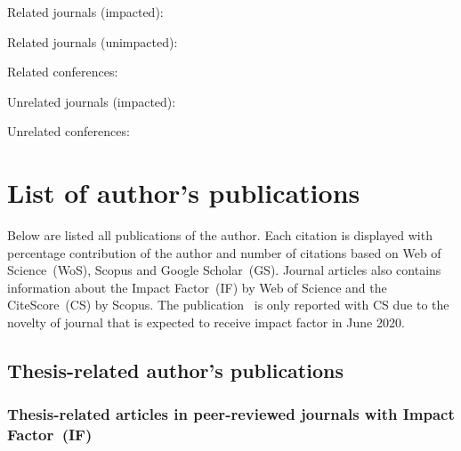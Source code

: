 \documentclass[a4paper,11pt,titlepage,twoside]{book}
\newcommand{\conditionalClearPage}{
  \ifdefined\printversion
  \clearemptydoublepage
  \else
  \newpage{}
  \clearpage
\fi
}
\begin{document}

Related journals (impacted):
\cite{baca2019autonomous}
\cite{baca2018rospix}
\cite{spurny2018cooperative}
\cite{saska2016system}
\cite{giernacky2019realtime}
\cite{chudoba2016exploration}

Related journals (unimpacted):
\cite{loianno2018localization}

Related conferences:
\cite{baca2019timepix}
\cite{baca2018model}
\cite{baca2016embedded}
\cite{baca2017autonomous}
\cite{saska2017documentation}
\cite{spurny2016complex}
\cite{faigl2017onsolution}
\cite{saska2016migrating}

Unrelated journals (impacted):
\cite{baca2016miniaturized}
\cite{baca2018vzlusat}
\cite{daniel2019inorbit}
\cite{urban2017vzlusat}

Unrelated conferences:
\cite{daniel2016terrestrial}
\cite{daniel2017xray}



\conditionalClearPage
\printbibliography[notkeyword=mine]
\conditionalClearPage



\appendix
\renewcommand\chaptername{Appendix}

\chapter{List of author's publications}

Below are listed all publications of the author.
Each citation is displayed with percentage contribution of the author and number of citations based on Web of Science~(WoS), Scopus and Google Scholar~(GS).
Journal articles also contains information about the Impact Factor~(IF) by Web of Science and the CiteScore~(CS) by Scopus.
The publication~\cite{loianno2018localization} is only reported with CS due to the novelty of journal that is expected to receive impact factor in June 2020.

\section{Thesis-related author's publications}

\subsection*{Thesis-related articles in peer-reviewed journals with Impact Factor~(IF)}
\nocite{}
\printbibliography[keyword={mine},keyword={phd_related},keyword={journal},keyword={if},heading=none,title={}]
\end{document}
